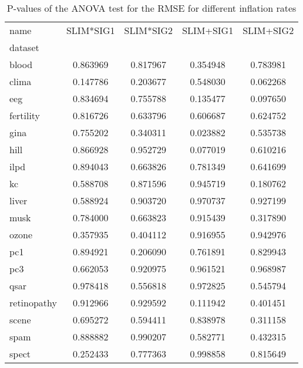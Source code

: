 
    \begin{table}[h]
        \centering
        \renewcommand{\arraystretch}{1.2}
        \begin{tabular}{lcccc}
\toprule
name & SLIM*SIG1 & SLIM*SIG2 & SLIM+SIG1 & SLIM+SIG2 \\
dataset &  &  &  &  \\
\midrule
blood & 0.863969 & 0.817967 & 0.354948 & 0.783981 \\
clima & 0.147786 & 0.203677 & 0.548030 & 0.062268 \\
eeg & 0.834694 & 0.755788 & 0.135477 & 0.097650 \\
fertility & 0.816726 & 0.633796 & 0.606687 & 0.624752 \\
gina & 0.755202 & 0.340311 & 0.023882 & 0.535738 \\
hill & 0.866928 & 0.952729 & 0.077019 & 0.610216 \\
ilpd & 0.894043 & 0.663826 & 0.781349 & 0.641699 \\
kc & 0.588708 & 0.871596 & 0.945719 & 0.180762 \\
liver & 0.588924 & 0.903720 & 0.970737 & 0.927199 \\
musk & 0.784000 & 0.663823 & 0.915439 & 0.317890 \\
ozone & 0.357935 & 0.404112 & 0.916955 & 0.942976 \\
pc1 & 0.894921 & 0.206090 & 0.761891 & 0.829943 \\
pc3 & 0.662053 & 0.920975 & 0.961521 & 0.968987 \\
qsar & 0.978418 & 0.556818 & 0.972825 & 0.545794 \\
retinopathy & 0.912966 & 0.929592 & 0.111942 & 0.401451 \\
scene & 0.695272 & 0.594411 & 0.838978 & 0.311158 \\
spam & 0.888882 & 0.990207 & 0.582771 & 0.432315 \\
spect & 0.252433 & 0.777363 & 0.998858 & 0.815649 \\
\bottomrule
\end{tabular}

        \caption{P-values of the ANOVA test for the RMSE for different inflation rates}
        \label{tab:anova_rmse}
    \end{table}
    